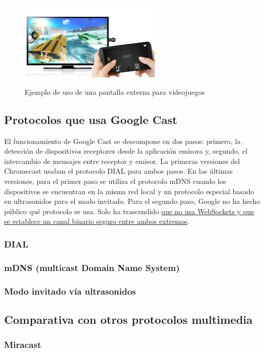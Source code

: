 \begin{figure}[h]
	\centering
	\includegraphics[width=0.6\textwidth]{./Imagenes/gameexample.jpg}
	\label{fig:fondo}
	\caption{Ejemplo de uso de una pantalla externa para videojuegos}
\end{figure}


\subsection{Protocolos que usa Google Cast}

El funcionamiento de Google Cast se descompone en dos pasos: primero, la detección de dispositivos receptores desde la aplicación emisora y, segundo, el intercambio de mensajes entre receptor y emisor.
La primeras versiones del Chromecast usaban el protocolo DIAL para ambos pasos.
En las últimas versiones, para el primer paso se utiliza el protocolo mDNS cuando los dispositivos se encuentran en la misma red local y un protocolo especial basado en ultrasonidos para el modo invitado. Para el segundo paso, Google no ha hecho público qué protocolo se usa. Solo ha trascendido \href{https://plus.google.com/116723992087294619013/posts/d6TLN4S8mrH}{que no usa WebSockets y que se establece un canal binario seguro entre ambos extremos}.

\subsubsection{DIAL}


\subsubsection{mDNS (multicast Domain Name System)}


\subsubsection{Modo invitado vía ultrasonidos}


\subsection{Comparativa con otros protocolos multimedia}

\subsubsection{Miracast}

